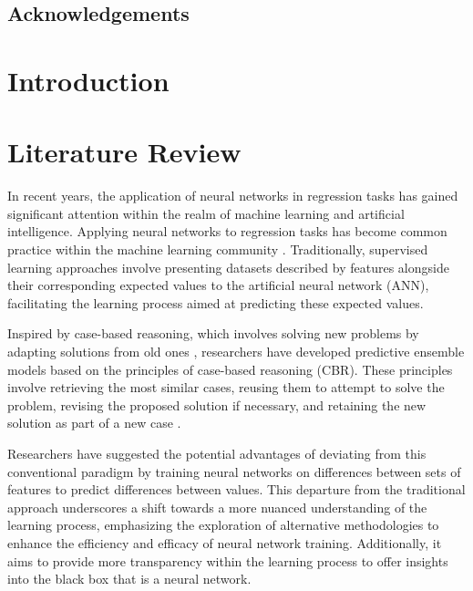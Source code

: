 \documentclass[a4paper, 12pt]{report}
\begin{document}
\section{Acknowledgements}


\tableofcontents

\listoffigures

\listoftables

\chapter{Introduction}
\label{ch:introduction}


\chapter{Literature Review}
\label{ch:Literature Review}

In recent years, the application of neural networks in regression tasks has gained significant attention within the realm of machine learning and artificial intelligence. 
Applying neural networks to regression tasks has become common practice within the machine learning community \cite{neuralNetForRegression}. 
Traditionally, supervised learning approaches involve presenting datasets described by features alongside their corresponding expected values to the artificial neural network (ANN), 
facilitating the learning process aimed at predicting these expected values.

Inspired by case-based reasoning, which involves solving new problems by adapting solutions from old ones \cite{riesbeck2013inside}, 
researchers have developed predictive ensemble models based on the principles of case-based reasoning (CBR). 
These principles involve retrieving the most similar cases, reusing them to attempt to solve the problem, revising the proposed solution if necessary, 
and retaining the new solution as part of a new case \cite{watsonCaseBasedReasoningReview}.

Researchers have suggested the potential advantages of deviating from this conventional paradigm by training neural networks on differences between sets of features to predict 
differences between values. This departure from the traditional approach underscores a shift towards a more nuanced understanding of the learning process, 
emphasizing the exploration of alternative methodologies to enhance the efficiency and efficacy of neural network training.
Additionally, it aims to provide more transparency within the learning process to offer insights into the black box that is a neural network.
\end{document}

